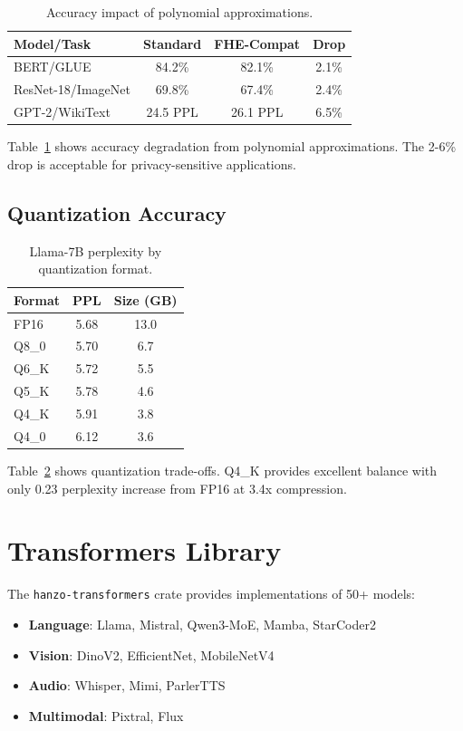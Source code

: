 \documentclass[11pt,twocolumn]{article}
\begin{document}
\begin{table}[h]
\centering
\caption{Accuracy impact of polynomial approximations.}
\label{tab:fhe_acc}
\begin{tabular}{lccc}
\toprule
\textbf{Model/Task} & \textbf{Standard} & \textbf{FHE-Compat} & \textbf{Drop} \\
\midrule
BERT/GLUE & 84.2\% & 82.1\% & 2.1\% \\
ResNet-18/ImageNet & 69.8\% & 67.4\% & 2.4\% \\
GPT-2/WikiText & 24.5 PPL & 26.1 PPL & 6.5\% \\
\bottomrule
\end{tabular}
\end{table}

Table~\ref{tab:fhe_acc} shows accuracy degradation from polynomial approximations. The 2-6\% drop is acceptable for privacy-sensitive applications.

\subsection{Quantization Accuracy}

\begin{table}[h]
\centering
\caption{Llama-7B perplexity by quantization format.}
\label{tab:quant}
\begin{tabular}{lcc}
\toprule
\textbf{Format} & \textbf{PPL} & \textbf{Size (GB)} \\
\midrule
FP16 & 5.68 & 13.0 \\
Q8\_0 & 5.70 & 6.7 \\
Q6\_K & 5.72 & 5.5 \\
Q5\_K & 5.78 & 4.6 \\
Q4\_K & 5.91 & 3.8 \\
Q4\_0 & 6.12 & 3.6 \\
\bottomrule
\end{tabular}
\end{table}

Table~\ref{tab:quant} shows quantization trade-offs. Q4\_K provides excellent balance with only 0.23 perplexity increase from FP16 at 3.4x compression.

\section{Transformers Library}

The \texttt{hanzo-transformers} crate provides implementations of 50+ models:

\begin{itemize}
    \item \textbf{Language}: Llama, Mistral, Qwen3-MoE, Mamba, StarCoder2
    \item \textbf{Vision}: DinoV2, EfficientNet, MobileNetV4
    \item \textbf{Audio}: Whisper, Mimi, ParlerTTS
    \item \textbf{Multimodal}: Pixtral, Flux
\end{itemize}
\end{document}
